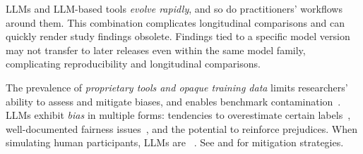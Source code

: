 LLMs and LLM-based tools \emph{evolve rapidly}, and so do practitioners' workflows around them. This combination complicates longitudinal comparisons and can quickly render study findings obsolete.
Findings tied to a specific model version may not transfer to later releases even within the same model family, complicating reproducibility and longitudinal comparisons.

The prevalence of \emph{proprietary tools and opaque training data} limits researchers' ability to assess and mitigate biases, and enables benchmark contamination~\cite{DBLP:journals/corr/abs-2410-16186}. LLMs exhibit \emph{bias} in multiple forms: tendencies to overestimate certain labels~\cite{DBLP:journals/corr/abs-2304-10145}, well-documented fairness issues~\cite{DBLP:journals/coling/GallegosRBTKDYZA24}, and the potential to reinforce prejudices. When simulating human participants, LLMs are ~\cite{DBLP:journals/natmi/WangMD25}. See \openllm and \limitationsmitigations for mitigation strategies.

